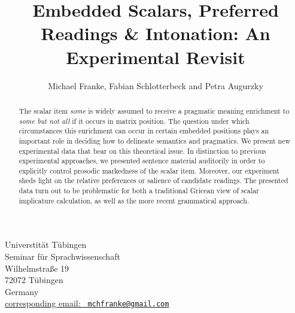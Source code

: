 \documentclass[fleqn,reqno,12pt]{article}
\title{Embedded Scalars, Preferred Readings \& Intonation: {A}n
  Experimental Revisit}
\author{Michael Franke, Fabian Schlotterbeck and Petra Augurzky
}
\date{}
\begin{document}
\maketitle

\thispagestyle{empty}

\vspace*{-1cm}
\begin{center}
  Universtit\"at T\"ubingen \\
  Seminar f\"ur Sprachwissenschaft \\
  Wilhelmstra\ss e 19\\
  72072 T\"ubingen\\
  Germany  \\
  \bigskip \href{mailto:mchfranke@gmail.com}{corresponding email: \tt
    mchfranke@gmail.com}
\end{center}

 \vspace*{1cm}



\begin{abstract}
  The scalar item \emph{some} is widely assumed to receive a pragmatic
  meaning enrichment to \emph{some but not all} if it occurs in matrix
  position. The question under which circumstances this enrichment can
  occur in certain embedded positions plays an important role in
  deciding how to delineate semantics and pragmatics. %
  We present new experimental data that bear on this theoretical
  issue. In distinction to previous experimental approaches, we
  presented sentence material auditorily in order to explicitly
  control prosodic markedness of the scalar item. Moreover, our
  experiment sheds light on the relative preferences or salience of
  candidate readings. The presented data turn out to be problematic
  for both a traditional Gricean view of scalar implicature
  calculation, as well as the more recent grammatical approach.
\end{abstract}
\end{document}
